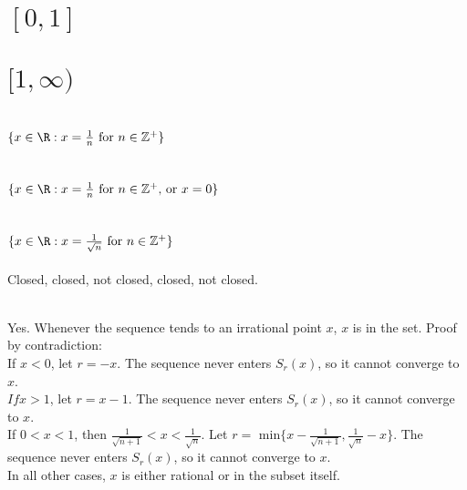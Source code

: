 
\begin{parts}
 
 \part{$[0,1]$}
 \part{$[1,\infty)$}
 \part{$\{x\in\R:x=\frac{1}{n} \text{ for }n \in \mathbb{Z}^+\}$}
  \part{$\{x\in\R:x=\frac{1}{n} \text{ for }n \in \mathbb{Z}^+\text{, or }x=0\}$}
  \part{$\{x\in\R:x=\frac{1}{\sqrt{n}} \text{ for } n \in \mathbb{Z}^+\}$}
  
\end{parts}

\begin{solution}
 Closed, closed, not closed, closed, not closed.
\end{solution}


\begin{solution}
 \\Yes. Whenever the sequence tends to an irrational point $x$, $x$ is in the set. Proof by contradiction: \\
 If $x < 0$, let $r = -x$. The sequence never enters $S_r(x)$, so it cannot converge to $x$. \\
 $If x > 1$, let $r = x-1$. The sequence never enters $S_r(x)$, so it cannot converge to $x$. \\
If $0<x<1$, then $\frac{1}{\sqrt{n+1}} < x < \frac{1}{\sqrt{n}}$. Let $r = \text{ min} \{x-\frac{1}{\sqrt{n+1}}, \frac{1}{\sqrt{n}}-x\}$. The sequence never enters $S_r(x)$, so it cannot converge to $x$. \\
In all other cases, $x$ is either rational or in the subset itself.
\end{solution}

